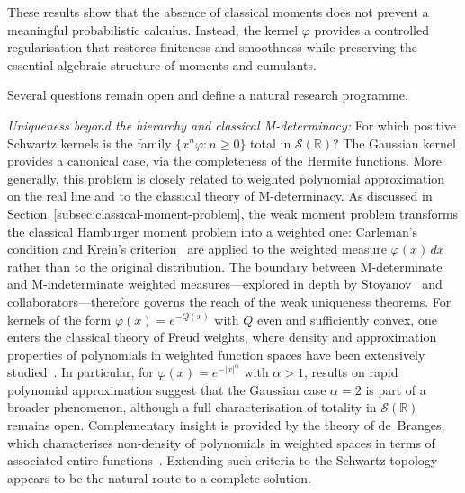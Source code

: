\documentclass[12pt]{article}
\theoremstyle{definition}
\newcommand{\R}{\mathbb{R}}
\begin{document}
These results show that the absence of classical moments does not prevent a
meaningful probabilistic calculus. Instead, the kernel $\varphi$ provides a
controlled regularisation that restores finiteness and smoothness while
preserving the essential algebraic structure of moments and cumulants.

\medskip

Several questions remain open and define a natural research programme.

\emph{Uniqueness beyond the hierarchy and classical M-determinacy:}
For which positive Schwartz kernels is the family
$\{x^n\varphi:n\ge 0\}$ total in $\mathcal{S}(\R)$?
The Gaussian kernel provides a canonical case, via the completeness of the
Hermite functions. More generally, this problem is closely related to
weighted polynomial approximation on the real line and to the classical
theory of M-determinacy.  As discussed in
Section~\ref{subsec:classical-moment-problem}, the weak moment problem
transforms the classical Hamburger moment problem into a weighted one:
Carleman's condition and Krein's criterion~\cite{Stoyanov2000Krein} are applied to
the weighted measure $\varphi(x)\,dx$ rather than to the original
distribution.  The boundary between M-determinate and M-indeterminate
weighted measures---explored in depth by
Stoyanov~\cite{Stoyanov2013,StoyanovInverardiTagliani2023} and
collaborators---therefore governs the reach of the weak uniqueness
theorems.  For kernels of the form $\varphi(x)=e^{-Q(x)}$ with $Q$ even
and sufficiently convex, one enters the classical theory of Freud weights,
where density and approximation properties of polynomials in weighted
function spaces have been extensively
studied~\cite{Lubinsky2007}. In particular, for
$\varphi(x)=e^{-|x|^\alpha}$ with $\alpha>1$, results on rapid polynomial
approximation suggest that the Gaussian case $\alpha=2$ is part of a broader
phenomenon, although a full characterisation of totality in
$\mathcal{S}(\R)$ remains open. Complementary insight is provided by the
theory of de~Branges, which characterises non-density of polynomials in
weighted spaces in terms of associated entire functions~\cite{deBranges1968}.
Extending such criteria to the Schwartz topology
appears to be the natural route to a complete solution.
\end{document}
